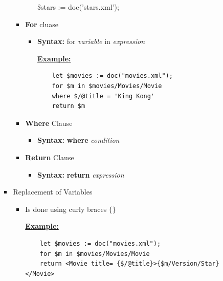 \documentclass[12pt]{article}
\begin{document}
\begin{enumerate}[1.]
\begin{enumerate}[a)]
\begin{itemize}
\begin{itemize}
\begin{itemize}
                    \$stars := doc('stars.xml');

                \end{itemize}

                \item \textbf{For} cluase

                \begin{itemize}
                    \item \textbf{Syntax:} for \textit{variable} in \textit{expression}

                    \bigskip

                    \underline{\textbf{Example:}}

    \begin{lstlisting}
    let $movies := doc("movies.xml");
    for $m in $movies/Movies/Movie
    where $/@title = 'King Kong'
    return $m
    \end{lstlisting}
                \end{itemize}

                \item \textbf{Where} Clause
                \begin{itemize}
                    \item \textbf{Syntax:} \textbf{where} \textit{condition}
                \end{itemize}

                \item \textbf{Return} Clause
                \begin{itemize}
                    \item \textbf{Syntax:} \textbf{return} \textit{expression}
                \end{itemize}

            \end{itemize}

            \item Replacement of Variables
            \begin{itemize}
                \item Is done using curly braces $\{\}$

                \bigskip

                \underline{\textbf{Example:}}

    \begin{lstlisting}
    let $movies := doc("movies.xml");
    for $m in $movies/Movies/Movie
    return <Movie title= {$/@title}>{$m/Version/Star}</Movie>
    \end{lstlisting}
            \end{itemize}

        \end{itemize}

    \end{enumerate}
\end{enumerate}
\end{document}
